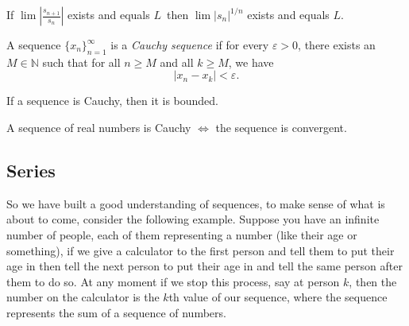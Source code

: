 \documentclass[../main.tex]{subfiles}
\begin{document}
    
    
    
    \begin{exercise}
    If \(\lim \left| \frac{s_{n+1}}{s_n} \right|\) exists and equals \(L\)\, then \(\lim |s_n|^{1/n}\) exists and equals \(L\).
    
    \end{exercise}
    
    
    
    
    
    
    
    
    
    
    
    
    
    
    
    
    \begin{definition}\label{def:cauchy_sequence}
    A sequence \( \{x_n\}_{n=1}^{\infty} \) is a \textit{Cauchy sequence} if for every \( \varepsilon > 0 \), there exists an \( M \in \mathbb{N} \) such that for all \( n \geq M \) and all \( k \geq M \), we have
    \[
    |x_n - x_k| < \varepsilon.
    \]
    \end{definition}
    
    
    
    
    
    
    
    
    
    \begin{lemma}
    If a sequence is Cauchy, then it is bounded. 
    \end{lemma}
    
    
    
    
    \begin{theorem}\label{thm:cauchy_convergence}
    A sequence of real numbers is Cauchy $ \iff$ the sequence is convergent. 
        
    \end{theorem}
    
    
    \subsection{Series}
    \par So we have built a good understanding of sequences, to make sense of what is about to come, consider the following example. Suppose you have an infinite number of people, each of them representing a number (like their age or something), if we give a calculator to the first person and tell them to put their age in then tell the next person to put their age in and tell the same person after them to do so. At any moment if we stop this process, say at person $k$, then the number on the calculator is the $k$th value of our sequence, where the sequence represents the sum of a sequence of numbers. 
    
\end{document}

